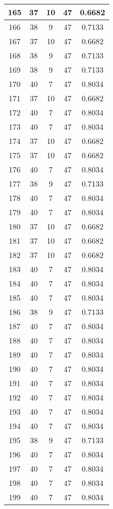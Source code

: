 \documentclass[letterpaper, 12pt]{article}
\begin{document}
\begin{longtable}{|c|c|c|c|c|}
\hline
165 & 37 & 10 & 47 & 0.6682 \\
\hline
166 & 38 & 9 & 47 & 0.7133 \\
\hline
167 & 37 & 10 & 47 & 0.6682 \\
\hline
168 & 38 & 9 & 47 & 0.7133 \\
\hline
169 & 38 & 9 & 47 & 0.7133 \\
\hline
170 & 40 & 7 & 47 & 0.8034 \\
\hline
171 & 37 & 10 & 47 & 0.6682 \\
\hline
172 & 40 & 7 & 47 & 0.8034 \\
\hline
173 & 40 & 7 & 47 & 0.8034 \\
\hline
174 & 37 & 10 & 47 & 0.6682 \\
\hline
175 & 37 & 10 & 47 & 0.6682 \\
\hline
176 & 40 & 7 & 47 & 0.8034 \\
\hline
177 & 38 & 9 & 47 & 0.7133 \\
\hline
178 & 40 & 7 & 47 & 0.8034 \\
\hline
179 & 40 & 7 & 47 & 0.8034 \\
\hline
180 & 37 & 10 & 47 & 0.6682 \\
\hline
181 & 37 & 10 & 47 & 0.6682 \\
\hline
182 & 37 & 10 & 47 & 0.6682 \\
\hline
183 & 40 & 7 & 47 & 0.8034 \\
\hline
184 & 40 & 7 & 47 & 0.8034 \\
\hline
185 & 40 & 7 & 47 & 0.8034 \\
\hline
186 & 38 & 9 & 47 & 0.7133 \\
\hline
187 & 40 & 7 & 47 & 0.8034 \\
\hline
188 & 40 & 7 & 47 & 0.8034 \\
\hline
189 & 40 & 7 & 47 & 0.8034 \\
\hline
190 & 40 & 7 & 47 & 0.8034 \\
\hline
191 & 40 & 7 & 47 & 0.8034 \\
\hline
192 & 40 & 7 & 47 & 0.8034 \\
\hline
193 & 40 & 7 & 47 & 0.8034 \\
\hline
194 & 40 & 7 & 47 & 0.8034 \\
\hline
195 & 38 & 9 & 47 & 0.7133 \\
\hline
196 & 40 & 7 & 47 & 0.8034 \\
\hline
197 & 40 & 7 & 47 & 0.8034 \\
\hline
198 & 40 & 7 & 47 & 0.8034 \\
\hline
199 & 40 & 7 & 47 & 0.8034 \\
\hline
\end{longtable}
\end{document}
